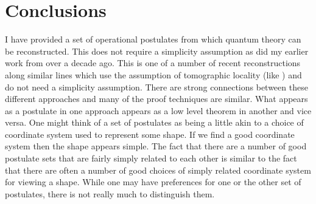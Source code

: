 \documentclass[10pt]{article}
\begin{document}
\section{Conclusions}


I have provided a set of operational postulates from which quantum theory can be reconstructed. This does not require a simplicity assumption as did my earlier work \cite{hardy2001quantum} from over a decade ago.   This is one of a number of recent reconstructions \cite{dakic2009quantum, chiribella2010informational, masanes2010derivation, masanes2012digital, zaopo2012information} along similar lines which use the assumption of tomographic locality (like \cite{hardy2001quantum}) and do not need a simplicity assumption.   There are strong connections between these different approaches and many of the proof techniques are similar.  What appears as a postulate in one approach appears as a low level theorem in another and vice versa.  One might think of a set of postulates as being a little akin to a choice of coordinate system used to represent some shape. If we find a good coordinate system then the shape appears simple.  The fact that there are a number of good postulate sets that are fairly simply related to each other is similar to the fact that there are often a number of good choices of simply related coordinate system for viewing a shape.   While one may have preferences for one or the other set of postulates, there is not really much to distinguish them.
\end{document}

